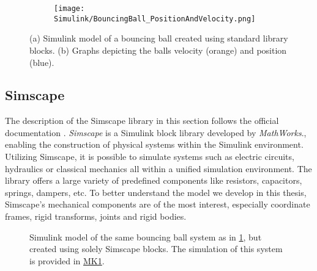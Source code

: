 \begin{figure}[h!]
	\begin{subfigure}{.5\textwidth} %
		\centering
		\caption{}
		\label{figure: Simulink bouncing ball model}
	\end{subfigure}
	\begin{subfigure}{.5\textwidth}
		\centering
		\texttt{[image: Simulink/BouncingBall\_PositionAndVelocity.png]}  
		\caption{}
		\label{figure: Simulink bouncing ball graphs}
	\end{subfigure}
	\caption[Simulink bouncing ball example]{(a) Simulink model of a bouncing ball created using standard library blocks. (b) Graphs depicting the balls velocity (orange) and position (blue).}
	\label{figure: Simulink bouncing ball example}
\end{figure}


\subsection{Simscape}
The description of the Simscape library in this section follows the official documentation \parencite{matlabSimscapeDocumentation}.
\textit{Simscape\textsuperscript{\texttrademark}} is a Simulink block library developed by \textit{MathWorks\textsuperscript{\textregistered}}., enabling the construction of physical systems within the Simulink environment.
Utilizing Simscape, it is possible to simulate systems such as electric circuits, hydraulics or classical mechanics all within a unified simulation environment.
The library offers a large variety of predefined components like resistors, capacitors, springs, dampers, etc.
To better understand the model we develop in this thesis, Simscape's mechanical components are of the most interest, especially coordinate frames, rigid transforms, joints and rigid bodies.

\begin{figure}[h!]
	\centering
	\centerline{}
	\caption[Simscape bouncing ball example]{Simulink model of the same bouncing ball system as in \ref{figure: Simulink bouncing ball model}, but created using solely Simscape blocks. The simulation of this system is provided in \hyperref[vid: MK1]{MK1}.} 
	\label{figure: Simscape Bouncing Ball Example}
\end{figure}

